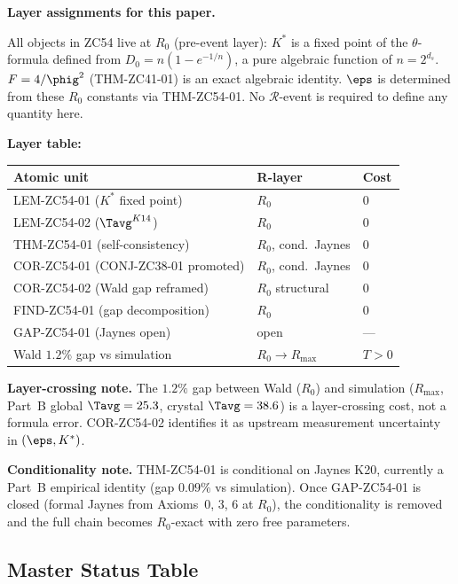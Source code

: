 \documentclass[12pt, a4paper]{article}
\begin{document}
\begin{layerbox}
\textbf{Layer assignments for this paper.}

All objects in ZC54 live at $R_0$ (pre-event layer):
$K^*$ is a fixed point of the $\theta$-formula defined from
$D_0 = n(1-e^{-1/n})$, a pure algebraic function of
$n = 2^{d_s}$.
$F = 4/\phig^2$ (THM-ZC41-01) is an exact algebraic identity.
$\eps$ is determined from these $R_0$ constants via THM-ZC54-01.
No $\mathcal{R}$-event is required to define any quantity here.

\textbf{Layer table:}
\begin{center}
\begin{tabular}{@{}lll@{}}
\toprule
Atomic unit & R-layer & Cost \\
\midrule
LEM-ZC54-01 ($K^*$ fixed point) & $R_0$ & $0$ \\
LEM-ZC54-02 ($\Tavg^{K14}$) & $R_0$ & $0$ \\
THM-ZC54-01 (self-consistency) & $R_0$, cond.\ Jaynes & $0$ \\
COR-ZC54-01 (CONJ-ZC38-01 promoted) & $R_0$, cond.\ Jaynes & $0$ \\
COR-ZC54-02 (Wald gap reframed) & $R_0$ structural & $0$ \\
FIND-ZC54-01 (gap decomposition) & $R_0$ & $0$ \\
GAP-ZC54-01 (Jaynes open) & open & --- \\
\midrule
Wald $1.2\%$ gap vs simulation & $R_0\to R_{\max}$ & $T>0$ \\
\bottomrule
\end{tabular}
\end{center}

\textbf{Layer-crossing note.}
The $1.2\%$ gap between Wald ($R_0$) and simulation
($R_{\max}$, Part~B global $\Tavg = 25.3$,
crystal $\Tavg = 38.6$) is a layer-crossing cost,
not a formula error.
COR-ZC54-02 identifies it as upstream measurement
uncertainty in $(\eps, K^*)$.

\textbf{Conditionality note.}
THM-ZC54-01 is conditional on Jaynes K20, currently a
Part~B empirical identity (gap $0.09\%$ vs simulation).
Once GAP-ZC54-01 is closed (formal Jaynes from Axioms~0,
3, 6 at $R_0$), the conditionality is removed and the
full chain becomes $R_0$-exact with zero free parameters.
\end{layerbox}

\subsection{Master Status Table}
\end{document}
